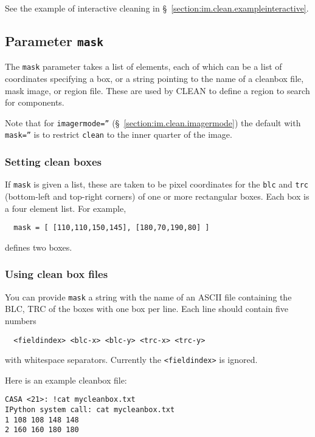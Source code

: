 See the example of interactive cleaning in 
\S~\ref{section:im.clean.exampleinteractive}.

\subsection{Parameter {\tt mask} }
\label{section:im.clean.mask}

The {\tt mask} parameter takes a list of elements, each of which can
be a list of coordinates specifying a box,
or a string pointing to the name of a cleanbox file, mask image, or
region file.  These are used by CLEAN to define a region to search for components.  

Note that for {\tt imagermode=''} (\S~\ref{section:im.clean.imagermode}) 
the default with {\tt mask=''} is to restrict {\tt clean} to the inner
quarter of the image.

\subsubsection{Setting clean boxes }
\label{section:im.clean.mask.box}

If {\tt mask} is given a list, these are taken to be pixel
coordinates for the {\tt blc} and {\tt trc} (bottom-left and top-right
corners) of one or more rectangular boxes.  Each box is a four element
list.  For example,
\small
\begin{verbatim}
  mask = [ [110,110,150,145], [180,70,190,80] ]
\end{verbatim}
\normalsize
defines two boxes.

\subsubsection{Using clean box files}
\label{section:im.clean.mask.boxfiles}

You can provide {\tt mask} a string with the name of  
an ASCII file containing the BLC, TRC of the boxes with one
box per line.  Each line should contain five numbers
\small
\begin{verbatim}
  <fieldindex> <blc-x> <blc-y> <trc-x> <trc-y>
\end{verbatim}
\normalsize
with whitespace separators.  Currently the {\tt <fieldindex>} is 
ignored.

Here is an example cleanbox file:
\small
\begin{verbatim}
CASA <21>: !cat mycleanbox.txt
IPython system call: cat mycleanbox.txt
1 108 108 148 148
2 160 160 180 180
\end{verbatim}
\normalsize


